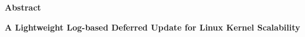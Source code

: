 \documentclass[doctor,korean,final]{kmu}
\begin{document}




\newif\ifkor
\kortrue 



\tableofcontents
\listoffigures

\setcounter{page}{\value{pagemarker}}         %
\label{paperlastromanpagelabel}     %

\hfill \break

\noindent
\Large{\textbf{Abstract}}

\noindent
\Large{\textbf{A Lightweight Log-based Deferred Update for Linux Kernel
Scalability}}
\end{document}
